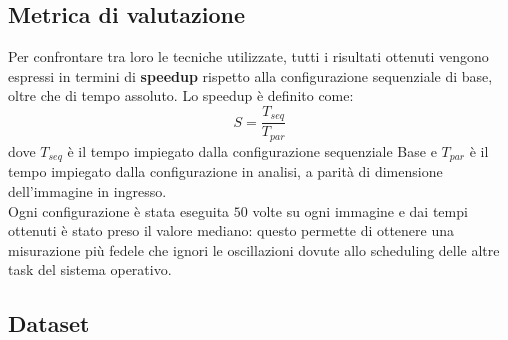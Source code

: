 \documentclass{article}
\begin{document}
\subsection{Metrica di valutazione}
\noindent Per confrontare tra loro le tecniche utilizzate, tutti i risultati ottenuti vengono espressi in termini di \textbf{speedup} rispetto alla configurazione sequenziale di base, oltre che di tempo assoluto. Lo speedup è definito come:
\begin{equation}
    S = \frac{T_{seq}}{T_{par}}
\end{equation}
dove $T_{seq}$ è il tempo impiegato dalla configurazione sequenziale Base e $T_{par}$ è il tempo impiegato dalla configurazione in analisi, a parità di dimensione dell'immagine in ingresso.\\
\noindent Ogni configurazione è stata eseguita $50$ volte su ogni immagine e dai tempi ottenuti è stato preso il valore mediano: questo permette di ottenere una misurazione più fedele che ignori le oscillazioni dovute allo scheduling delle altre task del sistema operativo.
\\

\newpage

\subsection{Dataset}
\end{document}
